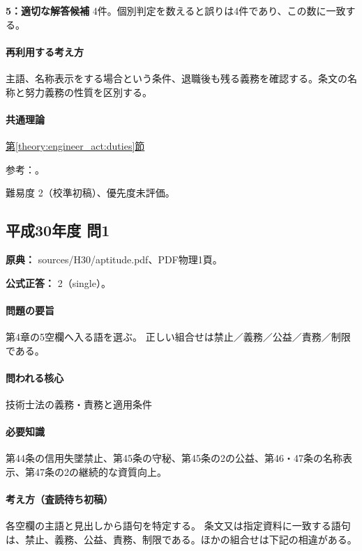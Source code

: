 \noindent\textbf{5：適切な解答候補} 4件。個別判定を数えると誤りは4件であり、この数に一致する。\par

\paragraph{再利用する考え方} 主語、名称表示をする場合という条件、退職後も残る義務を確認する。条文の名称と努力義務の性質を区別する。

\paragraph{共通理論} \hyperref[theory:engineer_act:duties]{第\ref*{theory:engineer_act:duties}節}

\par 参考：\cite{engineer_act_current}。

\par 難易度 2（校準初稿）、優先度未評価。

\subsection{平成30年度 問1}
\label{q:h30-reg-apt-01}

\noindent\textbf{原典：} sources/H30/aptitude.pdf、PDF物理1頁。

\textbf{公式正答：} 2（single）。

\paragraph{問題の要旨} 第4章の5空欄へ入る語を選ぶ。 正しい組合せは禁止／義務／公益／責務／制限である。

\paragraph{問われる核心} 技術士法の義務・責務と適用条件

\paragraph{必要知識} 第44条の信用失墜禁止、第45条の守秘、第45条の2の公益、第46・47条の名称表示、第47条の2の継続的な資質向上。

\paragraph{考え方（査読待ち初稿）} 各空欄の主語と見出しから語句を特定する。 条文又は指定資料に一致する語句は、禁止、義務、公益、責務、制限である。ほかの組合せは下記の相違がある。

